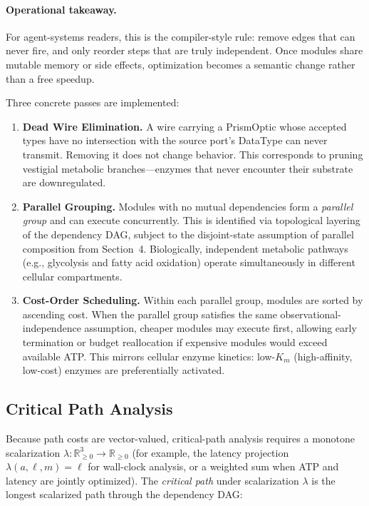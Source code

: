 \paragraph{Operational takeaway.}
For agent-systems readers, this is the compiler-style rule: remove edges that can never fire, and only reorder steps that are truly independent. Once modules share mutable memory or side effects, optimization becomes a semantic change rather than a free speedup.

\noindent Three concrete passes are implemented:

\begin{enumerate}[leftmargin=*]
\item \textbf{Dead Wire Elimination.} A wire carrying a PrismOptic
whose accepted types have no intersection with the source port's
DataType can never transmit. Removing it does not change behavior.
This corresponds to pruning vestigial metabolic branches---enzymes
that never encounter their substrate are downregulated.

\item \textbf{Parallel Grouping.} Modules with no mutual dependencies
form a \emph{parallel group} and can execute concurrently. This is
identified via topological layering of the dependency DAG, subject to
the disjoint-state assumption of parallel composition from Section~4.
Biologically,
independent metabolic pathways (e.g., glycolysis and fatty acid oxidation)
operate simultaneously in different cellular compartments.

\item \textbf{Cost-Order Scheduling.} Within each parallel group,
modules are sorted by ascending cost. When the parallel group satisfies
the same observational-independence assumption, cheaper modules may execute first,
allowing early termination or budget reallocation if expensive modules
would exceed available ATP. This mirrors cellular enzyme kinetics:
low-$K_m$ (high-affinity, low-cost) enzymes are preferentially activated.
\end{enumerate}

\subsection{Critical Path Analysis}

Because path costs are vector-valued, critical-path analysis requires a
monotone scalarization $\lambda : \mathbb{R}_{\geq 0}^3 \to \mathbb{R}_{\geq 0}$
(for example, the latency projection $\lambda(a,\ell,m)=\ell$ for wall-clock
analysis, or a weighted sum when ATP and latency are jointly optimized).
The \emph{critical path} under scalarization $\lambda$ is the longest
scalarized path through the dependency DAG:

